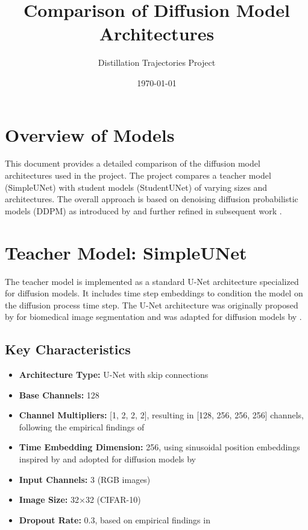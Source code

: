 \documentclass{article}
\title{Comparison of Diffusion Model Architectures}
\author{Distillation Trajectories Project}
\date{\today}
\begin{document}
\maketitle

\section{Overview of Models}

This document provides a detailed comparison of the diffusion model architectures used in the project. The project compares a teacher model (SimpleUNet) with student models (StudentUNet) of varying sizes and architectures. The overall approach is based on denoising diffusion probabilistic models (DDPM) as introduced by \citet{ho2020denoising} and further refined in subsequent work \citep{nichol2021improved, dhariwal2021diffusion}.

\section{Teacher Model: SimpleUNet}

The teacher model is implemented as a standard U-Net architecture specialized for diffusion models. It includes time step embeddings to condition the model on the diffusion process time step. The U-Net architecture was originally proposed by \citet{ronneberger2015unet} for biomedical image segmentation and was adapted for diffusion models by \citet{ho2020denoising}.

\subsection{Key Characteristics}

\begin{itemize}
  \item \textbf{Architecture Type:} U-Net with skip connections \citep{ronneberger2015unet, ho2020denoising}
  \item \textbf{Base Channels:} 128
  \item \textbf{Channel Multipliers:} [1, 2, 2, 2], resulting in [128, 256, 256, 256] channels, following the empirical findings of \citet{dhariwal2021diffusion}
  \item \textbf{Time Embedding Dimension:} 256, using sinusoidal position embeddings inspired by \citet{vaswani2017attention} and adopted for diffusion models by \citet{ho2020denoising}
  \item \textbf{Input Channels:} 3 (RGB images)
  \item \textbf{Image Size:} 32×32 (CIFAR-10)
  \item \textbf{Dropout Rate:} 0.3, based on empirical findings in \citet{nichol2021improved}
\end{itemize}
\end{document}
